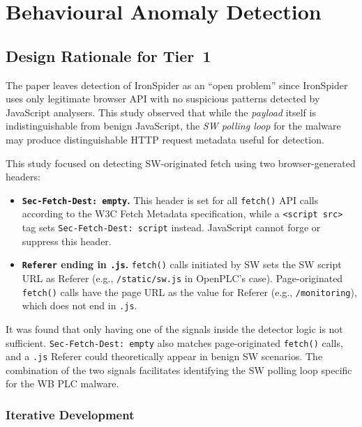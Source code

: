 \documentclass[conference]{IEEEtran}
\begin{document}
\section{Behavioural Anomaly Detection}
\label{sec:detection}

\subsection{Design Rationale for Tier~1}

The paper leaves detection of IronSpider as an ``open problem'' since IronSpider uses only legitimate browser API with no suspicious patterns detected by JavaScript analysers. This study observed that while the \emph{payload} itself is indistinguishable from benign JavaScript, the \emph{SW polling loop} for the malware may produce distinguishable HTTP request metadata useful for detection.

This study focused on detecting SW-originated fetch using two browser-generated headers:

\begin{itemize}
  \item \textbf{\texttt{Sec-Fetch-Dest: empty}.} This header is set for all \texttt{fetch()} API calls according to the W3C Fetch Metadata specification, while a \texttt{<script src>} tag sets \texttt{Sec-Fetch-Dest: script} instead. JavaScript cannot forge or suppress this header.

  \item \textbf{\texttt{Referer} ending in \texttt{.js}.} \texttt{fetch()} calls initiated by SW sets the SW script URL as Referer (e.g., \texttt{/static/sw.js} in OpenPLC's case). Page-originated \texttt{fetch()} calls have the page URL as the value for Referer (e.g., \texttt{/monitoring}), which does not end in \texttt{.js}.

\end{itemize}

It was found that only having one of the signals inside the detector logic is not sufficient. \texttt{Sec-Fetch-Dest: empty} also matches page-originated \texttt{fetch()} calls, and a \texttt{.js} Referer could theoretically appear in benign SW scenarios. The combination of the two signals facilitates identifying the SW polling loop specific for the WB PLC malware.

\subsubsection{Iterative Development}
\end{document}
